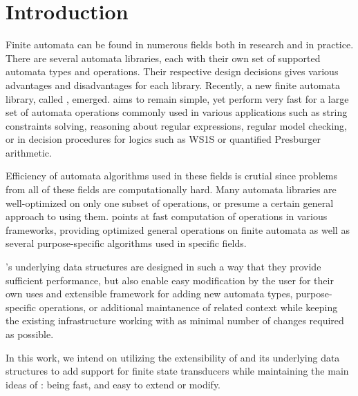 
% 

\chapter{Introduction}

Finite automata can be found in numerous fields both in research and in practice.
There are several automata libraries, each with their own set of supported automata types and operations.
Their respective design decisions gives various advantages and disadvantages for each library.
Recently, a new finite automata library, called \mata, emerged.
\mata aims to remain simple, yet perform very fast for a large set of automata operations commonly used in various applications such as string constraints solving, reasoning about regular expressions, regular model checking, or in decision procedures for logics such as WS1S or quantified Presburger arithmetic.

Efficiency of automata algorithms used in these fields is crutial since problems from all of these fields are computationally hard.
Many automata libraries are well-optimized on only one subset of operations, or presume a certain general approach to using them.
\mata points at fast computation of operations in various frameworks, providing optimized general operations on finite automata as well as several purpose-specific algorithms used in specific fields.

\mata's underlying data structures are designed in such a way that they provide sufficient performance, but also enable easy modification by the user for their own uses and extensible framework for adding new automata types, purpose-specific operations, or additional maintanence of related context while keeping the existing infrastructure working with as minimal number of changes required as possible.

In this work, we intend on utilizing the extensibility of \mata and its underlying data structures to add support for finite state transducers while maintaining the main ideas of \mata: being fast, and easy to extend or modify.

